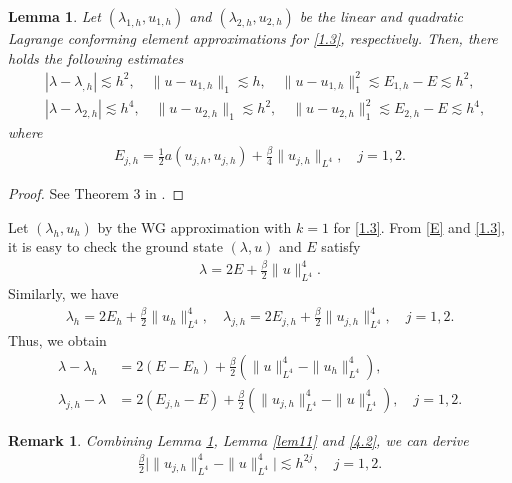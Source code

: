 \documentclass[compress, preprint,9pt]{elsarticle}
\numberwithin{equation}{section}
\newtheorem{lemma}{Lemma}[section]
\newtheorem{remark}{Remark}[section]
\begin{document}
\begin{lemma}\label{lem10}
	Let $(\lambda_{1,h},u_{1,h})$ and $(\lambda_{2,h},u_{2,h})$ be the linear and quadratic Lagrange conforming element approximations for \eqref{1.3}, respectively. Then, there holds the following estimates
	\begin{eqnarray*}
		&|\lambda-\lambda_{,h}|\lesssim h^2,\quad \|u-u_{1,h}\|_1\lesssim h,\quad \|u-u_{1,h}\|_1^2\lesssim E_{1,h}-E\lesssim h^2,\\
		&|\lambda-\lambda_{2,h}|\lesssim h^4,\quad \|u-u_{2,h}\|_1\lesssim h^2,\quad \|u-u_{2,h}\|_1^2\lesssim E_{2,h}-E\lesssim h^4,
	\end{eqnarray*}
	where
	\begin{eqnarray*}
		E_{j,h}=\frac12 a(u_{j,h},u_{j,h})+\frac{\beta}{4}\|u_{j,h}\|_{L^4},\quad j=1,2.
	\end{eqnarray*}
\end{lemma}
\begin{proof}
	See Theorem 3 in \cite{Eric2009}. 
\end{proof}

Let $(\lambda_h,u_h)$ by the WG approximation with $k=1$  for \eqref{1.3}. From \eqref{E} and \eqref{1.3}, it is easy to check the ground state $(\lambda,u)$ and $E$ satisfy
\begin{eqnarray*}
	\lambda=2E+\frac{\beta}{2}\|u\|_{L^4}^4.
\end{eqnarray*}
Similarly, we have
\begin{eqnarray*}
	\lambda_h=2E_h+\frac{\beta}{2}\|u_h\|_{L^4}^4,\quad
	\lambda_{j,h}=2E_{j,h}+\frac{\beta}{2}\|u_{j,h}\|_{L^4}^4,\quad j=1,2.
\end{eqnarray*}
Thus, we obtain
\begin{eqnarray}
	\lambda-\lambda_h&=2(E-E_h)+\frac{\beta}{2}(\|u\|_{L^4}^4-\|u_h\|_{L^4}^4),\label{4.1}\\
	\lambda_{j,h}-\lambda&=2(E_{j,h}-E)+\frac{\beta}{2}(\|u_{j,h}\|_{L^4}^4-\|u\|_{L^4}^4), \quad j=1,2.\label{4.2}
\end{eqnarray}
\begin{remark}
	Combining Lemma \ref{lem10}, Lemma \ref{lem11} and \ref{4.2}, we can derive
	\begin{eqnarray}\label{4.3}
		\frac{\beta}{2}\big|\|u_{j,h}\|_{L^4}^4-\|u\|_{L^4}^4\big|\lesssim h^{2j},\quad j=1,2.
	\end{eqnarray}
\end{remark}
\end{document}
